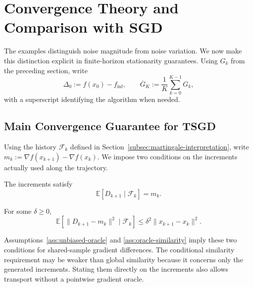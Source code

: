 \section{Convergence Theory and Comparison with SGD}
\label{sec:tsgd-convergence}

The examples distinguish noise magnitude from noise variation. We now
make this distinction explicit in finite-horizon stationarity guarantees.
Using $G_k$ from the preceding section, write
\[
\Delta_0:=f(x_0)-f_{\inf},\qquad
\overline G_K:=\frac1K\sum_{k=0}^{K-1}G_k,
\]
with a superscript identifying the algorithm when needed.

\subsection{Main Convergence Guarantee for TSGD}
\label{subsec:main-tsgd-theorem}

Using the history $\mathcal F_k$ defined in
Section~\ref{subsec:martingale-interpretation}, write
$m_k:=\nabla f(x_{k+1})-\nabla f(x_k)$. We impose two conditions
on the increments actually used along the trajectory.
\begin{assumption}
\label{ass:unbiased-transport}
The increments satisfy
\begin{equation}
\label{eq:unbiased-transport}
\mathbb E[D_{k+1}\mid\mathcal F_k]=m_k.
\end{equation}
\end{assumption}
\begin{assumption}
\label{ass:centered-similarity}
For some $\delta\geq0$,
\begin{equation}
\label{eq:centered-similarity}
\mathbb E[\|D_{k+1}-m_k\|^2\mid\mathcal F_k]
\leq\delta^2\|x_{k+1}-x_k\|^2.
\end{equation}
\end{assumption}
Assumptions~\ref{ass:unbiased-oracle} and \ref{ass:oracle-similarity}
imply these two conditions for shared-sample gradient differences.
The conditional similarity requirement may be weaker than global
similarity because it concerns only the generated increments.
Stating them directly on the increments also allows transport without
a pointwise gradient oracle.

